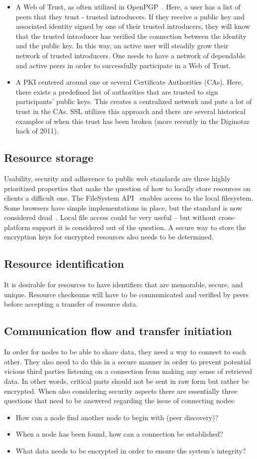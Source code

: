 \begin{itemize}
 \item A Web of Trust, as often utilized in OpenPGP~\cite{Maurer:1996}. Here, a user has a list of peers that they trust - trusted introducers. If they receive a public key and associated identity signed by one of their trusted introducers, they will know that the trusted introducer has verified the connection between the identity and the public key. In this way, an active user will steadily grow their network of trusted introducers. One needs to have a network of dependable and active peers in order to successfully participate in a Web of Trust.

\item A PKI centered around one or several Certificate Authorities (CAs). Here, there exists a predefined list of authorities that are trusted to sign participants' public keys. This creates a centralized network and puts a lot of trust in the CAs. SSL utilizes this approach and there are several historical examples of when this trust has been broken (more recently in the Diginotar hack of 2011).
\end{itemize}

\subsection{Resource storage}
Usability, security and adherence to public web standards are three highly prioritized properties that make the question of how to locally store resources on clients a difficult one. The FileSystem API~\cite{FileSystem:Online} enables access to the local filesystem. Some browsers have simple implementations in place, but the standard is now considered dead~\cite{W3C:2014}. Local file access could be very useful – but without cross-platform support it is considered out of the question. A secure way to store the encryption keys for encrypted resources also needs to be determined.

\subsection{Resource identification}
It is desirable for resources to have identifiers that are memorable, secure, and unique. Resource checksums will have to be communicated and verified by peers before accepting a transfer of resource data.

\subsection{Communication flow and transfer initiation}
In order for nodes to be able to share data, they need a way to connect to each other. They also need to do this in a secure manner in order to prevent potential vicious third parties listening on a connection from making any sense of retrieved data. In other words, critical parts should not be sent in raw form but rather be encrypted. When also considering security aspects there are essentially three questions that need to be answered regarding the issue of connecting nodes:

\begin{itemize}
\item How can a node find another node to begin with (peer discovery)?
\item When a node has been found, how can a connection be established?
\item What data needs to be encrypted in order to ensure the system's integrity?
\end{itemize}

